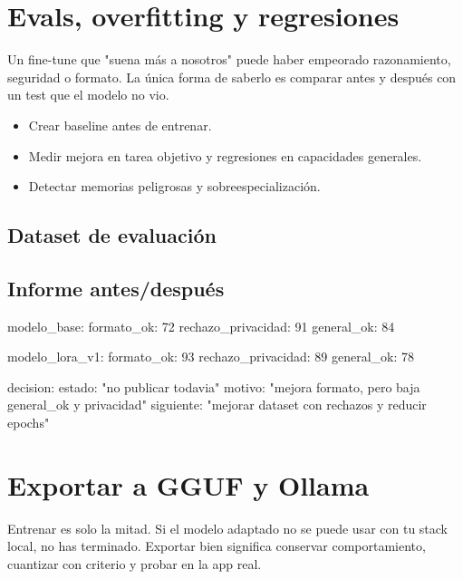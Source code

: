 \documentclass[11pt,a4paper]{book}
\begin{document}
\chapter{Evals, overfitting y regresiones}
Un fine-tune que "suena más a nosotros" puede haber empeorado razonamiento, seguridad o formato. La única forma de saberlo es comparar antes y después con un test que el modelo no vio.

\begin{itemize}\item Crear baseline antes de entrenar.\end{itemize}
\begin{itemize}\item Medir mejora en tarea objetivo y regresiones en capacidades generales.\end{itemize}
\begin{itemize}\item Detectar memorias peligrosas y sobreespecialización.\end{itemize}
\section{Dataset de evaluación}
\begin{codebox}
\end{codebox}
\section{Informe antes/después}
\begin{codebox}
modelo_base:
  formato_ok: 72%
  rechazo_privacidad: 91%
  general_ok: 84%

modelo_lora_v1:
  formato_ok: 93%
  rechazo_privacidad: 89%
  general_ok: 78%

decision:
  estado: "no publicar todavia"
  motivo: "mejora formato, pero baja general_ok y privacidad"
  siguiente: "mejorar dataset con rechazos y reducir epochs"
\end{codebox}
\chapter{Exportar a GGUF y Ollama}
Entrenar es solo la mitad. Si el modelo adaptado no se puede usar con tu stack local, no has terminado. Exportar bien significa conservar comportamiento, cuantizar con criterio y probar en la app real.
\end{document}
